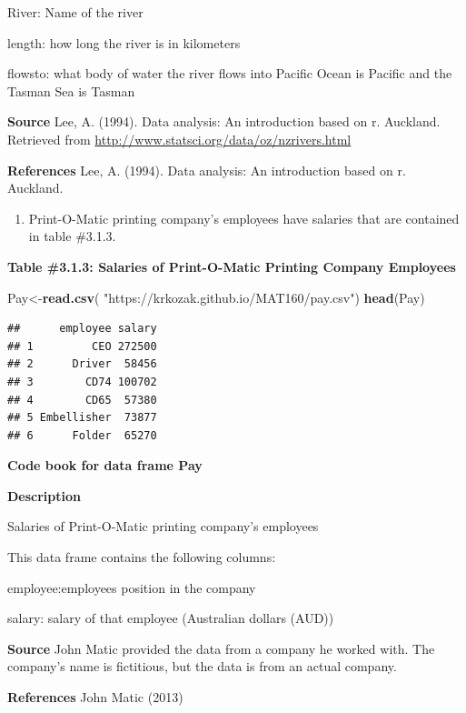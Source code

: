 \documentclass[
]{book}
\newenvironment{Shaded}{\begin{snugshade}}{\end{snugshade}}
\newcommand{\KeywordTok}[1]{\textcolor[rgb]{0.13,0.29,0.53}{\textbf{#1}}}
\newcommand{\NormalTok}[1]{#1}
\newcommand{\StringTok}[1]{\textcolor[rgb]{0.31,0.60,0.02}{#1}}
\providecommand{\tightlist}{%
  \setlength{\itemsep}{0pt}\setlength{\parskip}{0pt}}
\begin{document}
River: Name of the river

length: how long the river is in kilometers

flowsto: what body of water the river flows into Pacific Ocean is Pacific and the Tasman Sea is Tasman

\textbf{Source}
Lee, A. (1994). Data analysis: An introduction based on r. Auckland. Retrieved from
\url{http://www.statsci.org/data/oz/nzrivers.html}

\textbf{References}
Lee, A. (1994). Data analysis: An introduction based on r. Auckland.

\begin{enumerate}
\def\labelenumi{\arabic{enumi}.}
\setcounter{enumi}{2}
\tightlist
\item
  Print-O-Matic printing company's employees have salaries that are contained in table \#3.1.3.
\end{enumerate}

\textbf{Table \#3.1.3: Salaries of Print-O-Matic Printing Company Employees}

\begin{Shaded}
\begin{Highlighting}[]
\NormalTok{Pay<-}\KeywordTok{read.csv}\NormalTok{(}
  \StringTok{"https://krkozak.github.io/MAT160/pay.csv"}\NormalTok{)}
\KeywordTok{head}\NormalTok{(Pay)}
\end{Highlighting}
\end{Shaded}

\begin{verbatim}
##      employee salary
## 1         CEO 272500
## 2      Driver  58456
## 3        CD74 100702
## 4        CD65  57380
## 5 Embellisher  73877
## 6      Folder  65270
\end{verbatim}

\textbf{Code book for data frame Pay}

\textbf{Description}

Salaries of Print-O-Matic printing company's employees

This data frame contains the following columns:

employee:employees position in the company

salary: salary of that employee (Australian dollars (AUD))

\textbf{Source}
John Matic provided the data from a company he worked with. The company's name is fictitious, but the data is from an actual company.

\textbf{References}
John Matic (2013)
\end{document}
